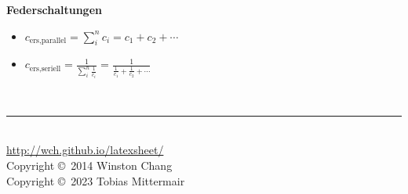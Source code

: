 \documentclass[10pt,a4paper,landscape, hidelinks]{article}
\begin{document}
\begin{multicols*}{3}
\vspace{20pt}

\textbf{Federschaltungen}
\begin{itemize}[leftmargin=*]
        \item [] $c_\text{ers,parallel}=\sum_{i}^{n}c_i=c_1+c_2+\cdots$
        \item [] $c_\text{ers,seriell}=\frac{1}{\sum_{i}^{n}\frac{1}{c_i}}=\frac{1}{\frac{1}{c_1}+\frac{1}{c_2}+\cdots}$
\end{itemize}

\par\vfill\null
\columnbreak

 
\vfill


\tabto{6.5cm}\rule{0.3\linewidth}{0.25pt}\\
\tiny
\tabto{6.5cm}\href{http://wch.github.io/latexsheet/}{http://wch.github.io/latexsheet/}\\
\tabto{6.5cm}Copyright \copyright\ 2014 Winston Chang\\
\tabto{6.5cm}Copyright \copyright\ 2023 Tobias Mittermair


\end{multicols*}
\end{document}

